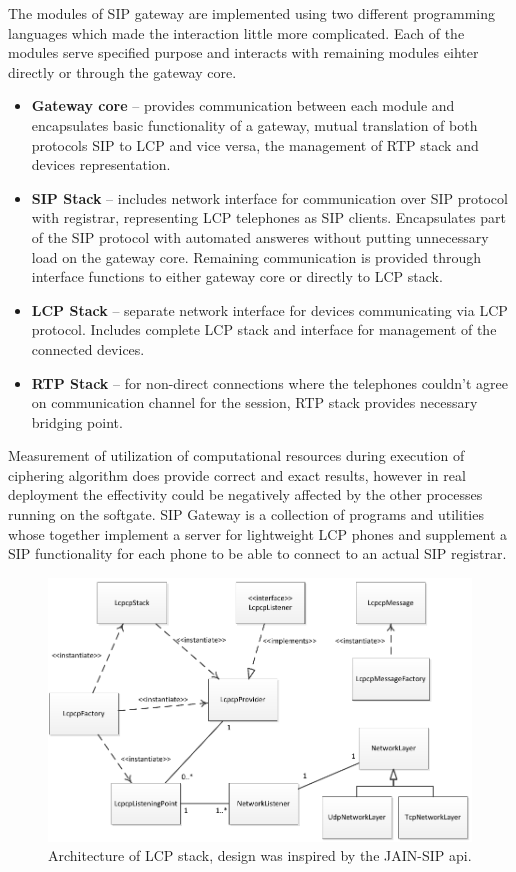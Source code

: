 The modules of SIP gateway are implemented using two different programming 
languages which made the interaction little more complicated. Each of the modules
serve specified purpose and interacts with remaining modules eihter directly
or through the gateway core.
\begin{itemize}
\item \textbf{Gateway core} -- provides communication between each module and 
encapsulates basic functionality of a gateway, mutual translation of both 
protocols SIP to LCP and vice versa, the management of RTP stack and 
devices representation.
\item \textbf{SIP Stack} -- includes network interface for communication
over SIP protocol with registrar, representing LCP telephones as SIP clients.
Encapsulates part of the SIP protocol with automated answeres without putting
unnecessary load on the gateway core. Remaining communication is provided through 
interface functions to either gateway core or directly to LCP stack.
\item \textbf{LCP Stack} -- separate network interface for devices communicating
via LCP protocol. Includes complete LCP stack and interface for management of
the connected devices.
\item \textbf{RTP Stack} -- for non-direct connections where the telephones 
couldn't agree on communication channel for the session, RTP stack provides
necessary bridging point.
\end{itemize}

Measurement of utilization of computational resources during execution of 
ciphering algorithm does provide correct and exact results, however in real 
deployment the effectivity could be negatively affected by the other processes 
running on the softgate. SIP Gateway is a collection of programs and utilities
whose together implement a server for lightweight LCP phones and supplement a
SIP functionality for each phone to be able to connect to an actual SIP 
registrar. 

\begin{figure}[h!]
\centering
\includegraphics[width=15cm]{fig/lcpstack.pdf}
\caption[LCP stack design]{Architecture of LCP stack, design was inspired by the 
JAIN-SIP api\cite{jainsip}.}
\label{lcpstack}
\end{figure}

